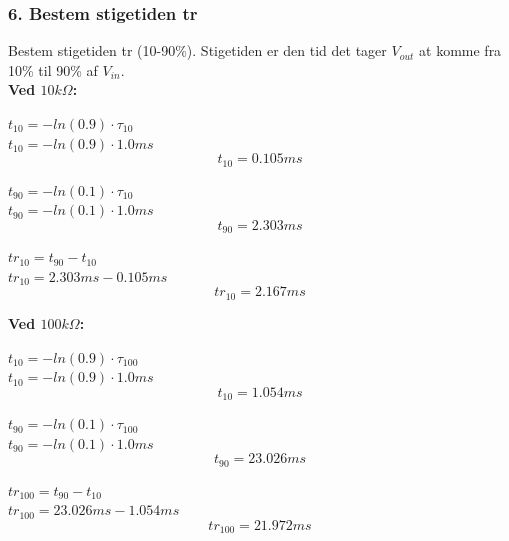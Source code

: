 \subsubsection*{6. Bestem stigetiden tr}
Bestem stigetiden tr (10-90\%).
Stigetiden er den tid det tager $V_{out}$ at komme fra 10\% til 90\% af $V_{in}$.\\

\textbf{Ved $10k\Omega$:}
\begin{center}
$t_{10}=-ln(0.9)\cdot \tau_{10}$\\
$t_{10}=-ln(0.9)\cdot 1.0 ms$
\begin{equation}
t_{10}= 0.105 ms
\label{t_10_10}
\end{equation}
\end{center}


\begin{center}
$t_{90}=-ln(0.1)\cdot \tau_{10}$\\
$t_{90}=-ln(0.1)\cdot 1.0 ms$
\begin{equation}
t_{90}= 2.303 ms
\label{t_10_90}
\end{equation}
\end{center}


\begin{center}
$tr_{10}=t_{90} - t_{10}$\\
$tr_{10}=2.303 ms - 0.105 ms$
\begin{equation}
tr_{10}= 2.167 ms
\label{tr_10}
\end{equation}
\end{center}


\textbf{Ved $100k\Omega$:}\\
\begin{center}
$t_{10}=-ln(0.9)\cdot \tau_{100}$\\
$t_{10}=-ln(0.9)\cdot 1.0 ms$
\begin{equation}
t_{10}= 1.054 ms
\label{t_100_10}
\end{equation}
\end{center}


\begin{center}
$t_{90}=-ln(0.1)\cdot \tau_{100}$\\
$t_{90}=-ln(0.1)\cdot 1.0 ms$
\begin{equation}
t_{90}= 23.026 ms
\label{t_100_90}
\end{equation}
\end{center}


\begin{center}
$tr_{100}=t_{90} - t_{10}$\\
$tr_{100}=23.026 ms - 1.054 ms$
\begin{equation}
tr_{100}= 21.972 ms
\label{tr_100}
\end{equation}
\end{center}
 

